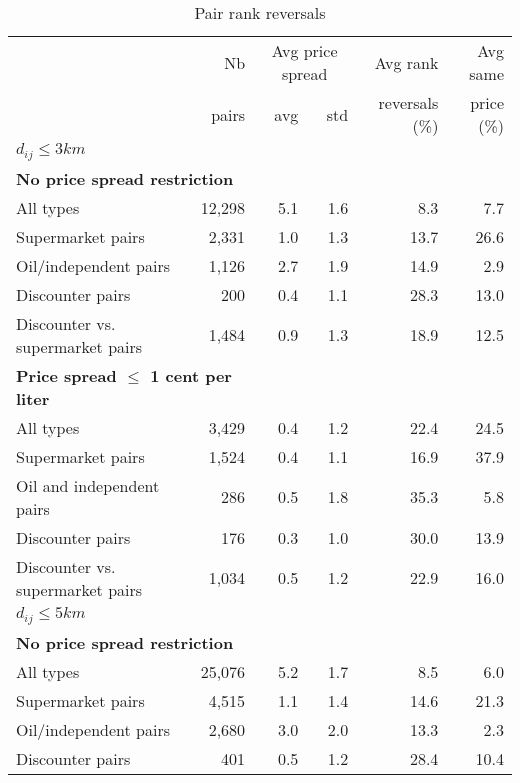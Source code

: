 \documentclass[english]{article}
\begin{document}
\begin{table}[H]
\begin{threeparttable}
\renewcommand{\arraystretch}{0.8} %
\caption{Pair rank reversals}
\label{tab:stats_pair_rank_reversals}
\begin{tabular}{lrrrrr}
\hline
\hline
      & Nb    & \multicolumn{2}{c}{Avg price spread} & Avg rank & Avg same \\
      & pairs & avg  & std                           & reversals (\%) & price (\%) \\
\hline
\textbf{$d_{ij} \le  3 km$} &       &       &       &       &  \\
\hline
\multicolumn{2}{l}{\textbf{No price spread restriction}}  &       &       &       &  \\
All types & 12,298 & 5.1   & 1.6   & 8.3   & 7.7 \\
Supermarket pairs & 2,331 & 1.0   & 1.3   & 13.7  & 26.6 \\
Oil/independent pairs & 1,126 & 2.7   & 1.9   & 14.9  & 2.9 \\
Discounter pairs & 200   & 0.4   & 1.1   & 28.3  & 13.0 \\
Discounter vs. supermarket pairs & 1,484 & 0.9   & 1.3   & 18.9  & 12.5 \\
\hline
\multicolumn{2}{l}{\textbf{Price spread $\le$ 1 cent per liter}}   &       &       &       &  \\
All types & 3,429 & 0.4   & 1.2   & 22.4  & 24.5 \\
Supermarket pairs & 1,524 & 0.4   & 1.1   & 16.9  & 37.9 \\
Oil and independent pairs & 286   & 0.5   & 1.8   & 35.3  & 5.8 \\
Discounter pairs & 176   & 0.3   & 1.0   & 30.0  & 13.9 \\
Discounter vs. supermarket pairs & 1,034 & 0.5   & 1.2   & 22.9  & 16.0 \\
\hline
\textbf{$d_{ij} \le  5 km$} &       &       &       &       &  \\
\hline
\multicolumn{2}{l}{\textbf{No price spread restriction}}   &       &       &       &  \\
All types & 25,076 & 5.2   & 1.7   & 8.5   & 6.0 \\
Supermarket pairs & 4,515 & 1.1   & 1.4   & 14.6  & 21.3 \\
Oil/independent pairs & 2,680 & 3.0   & 2.0   & 13.3  & 2.3 \\
Discounter pairs & 401   & 0.5   & 1.2   & 28.4  & 10.4 \\

\end{tabular}
\end{threeparttable}
\end{table}
\end{document}
